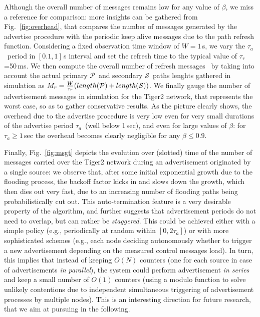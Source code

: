 \documentclass[conference]{IEEEtran}
\newcommand{\PA}{\ensuremath{\mathcal{P}}}
\newcommand{\SE}{\ensuremath{\mathcal{S}}}
\newcommand{\Be}{\ensuremath{\beta}} \newcommand{\ML}{\ensuremath{\kappa}} \newcommand{\PB}{\ensuremath{p_b}}
\newcommand{\tadvertise}{\ensuremath{\tau_{a}}} \newcommand{\trefresh}{\ensuremath{\tau_{r}}} \newcommand{\tm}{\tadvertise} \newcommand{\tr}{\trefresh}
\begin{document}
Although the overall number of messages remains low for any value of \Be, we miss a reference for comparison: more insights can be gathered  from Fig.~\ref{fig:overhead}, that compares the number of messages generated by the advertise procedure with the periodic keep alive messages due to the path refresh function. Considering a fixed observation time window of $W=1$\,s, we vary the \tadvertise\ period in $[0.1,1]$\,s interval and set the refresh time to the typical value of \trefresh=50\,ms. We then compute the overall number of refresh messages \nrefresh\ by taking into account the actual primary  \PA\ and secondary \SE\ paths lenghts gathered in simulation  as $\nrefresh=\frac{W}{\trefresh}(length(\PA)+length(\SE))$. We finally gauge the number of advertisement messages in simulation for the Tiger2 network, that represents the worst case, so as to gather conservative results.
 As the picture clearly shows, the overhead due to the advertise procedure is very low even for very small durations of the advertise period \tm\ (well below 1\,sec), and even for large values of $\Be$: for $\tm\ge 1$\,sec the overhead becomes clearly negligible for any $\beta\le 0.9$.


Finally, Fig.~\ref{fig:msgt} depicts the evolution over (slotted) time of the number of messages carried over the Tiger2 network during an advertisement originated by a single source: we observe that, after some initial exponential growth due to the flooding process, the backoff factor kicks in and slows down the growth, which then dies out very fast, due to an increasing number of flooding paths being probabilistically cut out. This auto-termination feature is a very desirable property of the algorithm, and further suggests that advertisement periods do not need to overlap, but can rather be \emph{staggered}.
This could be achieved either with a simple policy (e.g., periodically at random within $[0,2\tadvertise]$) or with more sophisticated schemes (e.g., each node deciding autonomously whether to trigger a new advertisement depending on the measured control messages load).  In turn, this implies that instead of keeping $O(N)$ counters (one for each source in case of advertisements \emph{in parallel}), the system could perform advertisement \emph{in series} and keep a small number of $O(1)$ counters (using a modulo function to solve unlikely contentions due to independent simultaneous triggering of advertisement processes by multiple nodes). This is an interesting direction for future research, that we aim at pursuing in the following.
\end{document}
